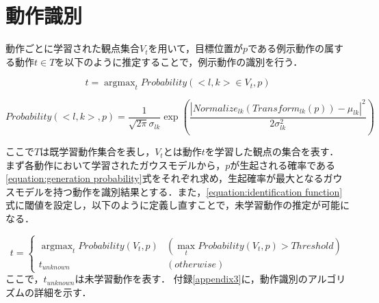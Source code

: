 \section{動作識別}

動作ごとに学習された観点集合$V_{t}$を用いて，目標位置が$p$である例示動作の属する動作$t∈T$を以下のように推定することで，例示動作の識別を行う．

\begin{equation}
	\label{equation:identification function}
	t =  \mathop{\arg\max}_{t}Probability(<l , k>∈V_{t} , p)
\end{equation}

\begin{equation}
	\label{equation:generation probability}
	Probability(<l , k> , p) = \frac{1}{\sqrt{2\pi}σ_{lk}}\exp \left(\frac{|Normalize_{lk}(Transform_{lk}(p))-μ_{lk}|^2}{2σ_{lk}^2}\right)
\end{equation}

ここで$T$は既学習動作集合を表し，$V_{t}$とは動作$t$を学習した観点の集合を表す．
まず各動作において学習されたガウスモデルから，$p$が生起される確率である\ref{equation:generation probability}式をそれぞれ求め，生起確率が最大となるガウスモデルを持つ動作を識別結果とする．また，\ref{equation:identification function}式に閾値を設定し，以下のように定義し直すことで，未学習動作の推定が可能になる．

\begin{equation}
	\label{equation:identification function2}
	t =
	\begin{cases}
		\mathop{\arg\max}_{t}Probability(V_{t} , p)		& (\mathop{\max}_{t}Probability(V_{t} , p) > Threshold) \\
		t_{unknown}					 			& (otherwise)
	\end{cases}	
\end{equation}
ここで，$t_{unknown}$は未学習動作を表す．
付録\ref{appendix3}に，動作識別のアルゴリズムの詳細を示す．


